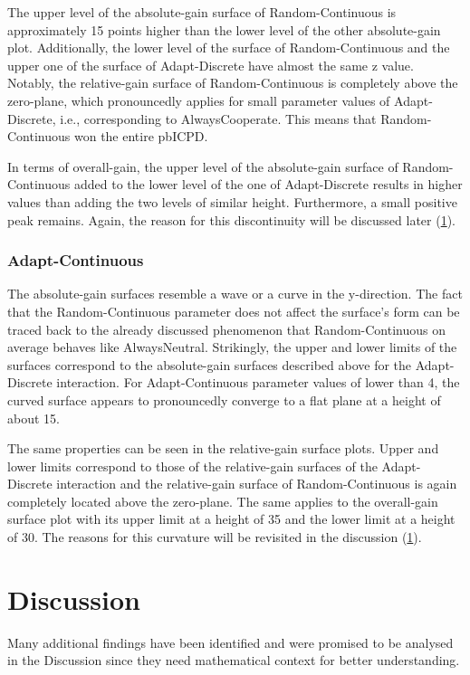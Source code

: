\documentclass[11pt]{article}
\begin{document}
	The upper level of the absolute-gain surface of Random-Continuous is approximately 15 points higher than the lower level of the other absolute-gain plot.
	Additionally, the lower level of the surface of Random-Continuous and the upper one of the surface of Adapt-Discrete have almost the same z value.
	Notably, the relative-gain surface of Random-Continuous is completely above the zero-plane, which pronouncedly applies for small parameter values of Adapt-Discrete, i.e., corresponding to AlwaysCooperate.
	This means that Random-Continuous won the entire pbICPD.

	In terms of overall-gain, the upper level of the absolute-gain surface of Random-Continuous added to the lower level of the one of Adapt-Discrete results in higher values than adding the two levels of similar height.
	Furthermore, a small positive peak remains.
	Again, the reason for this discontinuity will be discussed later (\ref{sec:discussion}).

\subsubsection*{Adapt-Continuous}
	The absolute-gain surfaces resemble a wave or a curve in the y-direction.
	The fact that the Random-Continuous parameter does not affect the surface's form can be traced back to the already discussed phenomenon that Random-Continuous on average behaves like AlwaysNeutral.
	Strikingly, the upper and lower limits of the surfaces correspond to the absolute-gain surfaces described above for the Adapt-Discrete interaction.
	For Adapt-Continuous parameter values of lower than 4, the curved surface appears to pronouncedly converge to a flat plane at a height of about 15.

	The same properties can be seen in the relative-gain surface plots.
	Upper and lower limits correspond to those of the relative-gain surfaces of the Adapt-Discrete interaction and the relative-gain surface of Random-Continuous is again completely located above the zero-plane.
	The same applies to the overall-gain surface plot with its upper limit at a height of 35 and the lower limit at a height of 30.
	The reasons for this curvature will be revisited in the discussion (\ref{sec:discussion}).


\section{Discussion} \label{sec:discussion}

Many additional findings have been identified and were promised to be analysed in the Discussion since they need mathematical context for better understanding.
\end{document}

